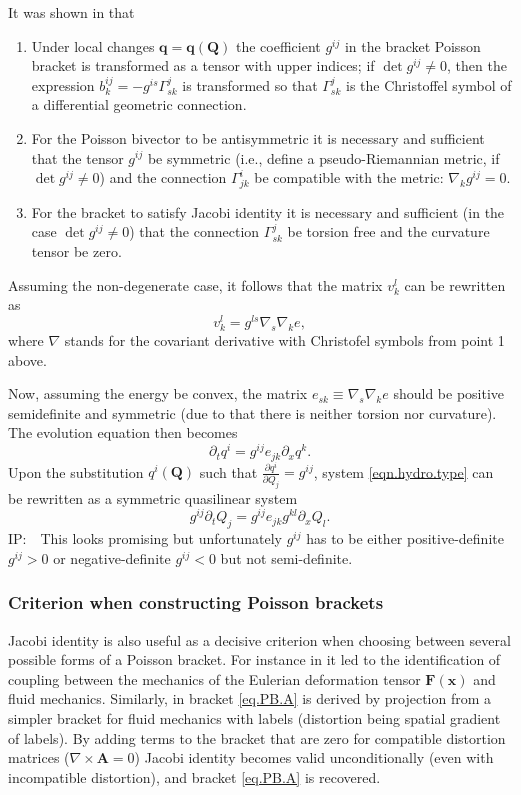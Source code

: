 \documentclass[
10pt, %
a4paper, %
oneside, %
headinclude,footinclude, %
BCOR5mm, %
]{scrartcl}
\newcommand{\xx}{\mathbf{x}}
\newcommand{\FF}{\mathbf{F}}
\renewcommand{\AA}{\mathbf{A}}
\newcommand{\qq}{\mathbf{q}}
\newcommand{\QQ}{\mathbf{Q}}
\newcommand{\IP}[1]{{\color{Red}IP:\ \ #1}}
\begin{document}
It was shown in \cite{Novikov} that
\begin{enumerate}
\item Under local changes $\qq = \qq(\QQ)$ the coefficient $g^{ij}$ in the bracket
		Poisson bracket is transformed as a tensor with upper indices; if $\det g^{ij} \neq 0$, then the expression
		$b^{ij}_k = -g^{is}\Gamma^j_{sk}$ is transformed so that $\Gamma^j_{sk}$ is the Christoffel symbol of a differential
geometric connection.
\item  For the Poisson bivector to be antisymmetric it is necessary and sufficient that the
	tensor $g^{ij}$ be symmetric (i.e., define a pseudo-Riemannian metric, if $\det g^{ij} \neq 0$) and
		the connection $\Gamma^i_{jk}$ be compatible with the metric: $\nabla_k g^{ij} = 0$.
	\item  For the bracket to satisfy Jacobi identity it is necessary and sufficient (in the case $\det g^{ij} \neq 0 $) that the connection $\Gamma^{j}_{sk}$ be torsion free and the curvature tensor be zero.
\end{enumerate}
Assuming the non-degenerate case, it follows that the matrix $v^l_k$ can be rewritten as
\begin{equation}
	v^l_k = g^{ls}\nabla_s \nabla_k e,
\end{equation}
where $\nabla$ stands for the covariant derivative with Christofel symbols from point 1 above.

Now, assuming the energy be convex, the matrix $e_{sk}\equiv \nabla_s \nabla_k e$ should be positive semidefinite and symmetric (due to that there is neither torsion nor curvature). The evolution equation then becomes
\begin{equation}
	\partial_t q^i = g^{ij} e_{jk}\partial_x q^k.
\end{equation}
Upon the substitution $q^i(\QQ)$ such that $\frac{\partial q^i}{\partial Q_j} = g^{ij}$, system \eqref{eqn.hydro.type} can be rewritten as a symmetric quasilinear system
\begin{equation}
	g^{ij}\partial_t Q_j = g^{ij} e_{jk} g^{kl} \partial_x Q_l.
\end{equation}
\IP{This looks promising but unfortunately $g^{ij}$ has to be either positive-definite $g^{ij}>0$ or negative-definite $g^{ij}<0$ but not semi-definite.}



\subsubsection{Criterion when constructing Poisson brackets}
Jacobi identity is also useful as a decisive criterion when choosing between several possible forms of a Poisson bracket. For instance in \cite{Markus2009} it led to the identification of coupling between the mechanics of the Eulerian deformation tensor $\FF(\xx)$ and fluid mechanics. Similarly, in \cite{SHTC-GENERIC}  bracket \eqref{eq.PB.A} is derived by projection from a simpler bracket for fluid mechanics with labels (distortion being spatial gradient of labels). By adding terms to the bracket that are zero for compatible distortion matrices ($\nabla\times\AA=0$) Jacobi identity becomes valid unconditionally (even with incompatible distortion), and bracket \eqref{eq.PB.A} is recovered.
\end{document}
